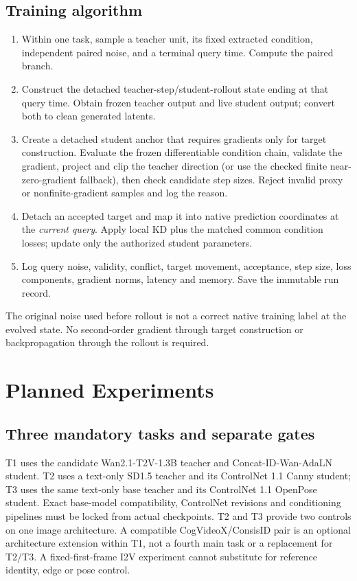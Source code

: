 \documentclass{article}
\begin{document}
\subsection{Training algorithm}
\begin{enumerate}
\item Within one task, sample a teacher unit, its fixed extracted condition, independent paired noise, and a terminal query time. Compute the paired branch.
\item Construct the detached teacher-step/student-rollout state ending at that query time. Obtain frozen teacher output and live student output; convert both to clean generated latents.
\item Create a detached student anchor that requires gradients only for target construction. Evaluate the frozen differentiable condition chain, validate the gradient, project and clip the teacher direction (or use the checked finite near-zero-gradient fallback), then check candidate step sizes. Reject invalid proxy or nonfinite-gradient samples and log the reason.
\item Detach an accepted target and map it into native prediction coordinates at the \emph{current query}. Apply local KD plus the matched common condition losses; update only the authorized student parameters.
\item Log query noise, validity, conflict, target movement, acceptance, step size, loss components, gradient norms, latency and memory. Save the immutable run record.
\end{enumerate}
The original noise used before rollout is not a correct native training label at the evolved state. No second-order gradient through target construction or backpropagation through the rollout is required.

\section{Planned Experiments}
\subsection{Three mandatory tasks and separate gates}
T1 uses the candidate Wan2.1-T2V-1.3B teacher and Concat-ID-Wan-AdaLN student. T2 uses a text-only SD1.5 teacher and its ControlNet 1.1 Canny student; T3 uses the same text-only base teacher and its ControlNet 1.1 OpenPose student. Exact base-model compatibility, ControlNet revisions and conditioning pipelines must be locked from actual checkpoints. T2 and T3 provide two controls on one image architecture. A compatible CogVideoX/ConsisID pair is an optional architecture extension within T1, not a fourth main task or a replacement for T2/T3. A fixed-first-frame I2V experiment cannot substitute for reference identity, edge or pose control.
\end{document}
